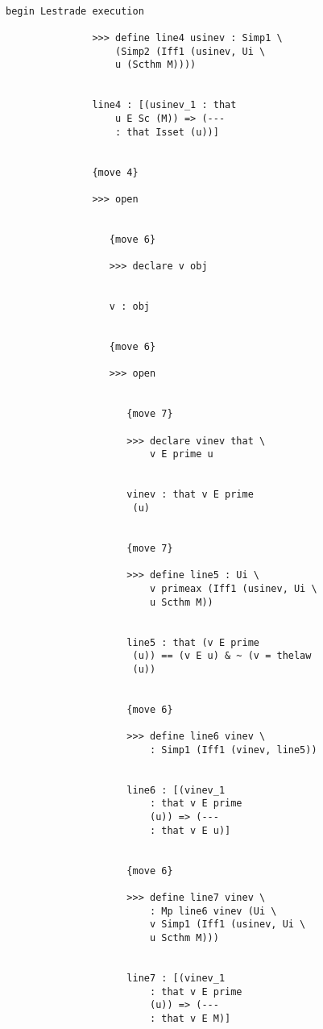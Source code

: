 \documentclass[12pt]{article}
\begin{document}
\begin{verbatim}

begin Lestrade execution

               >>> define line4 usinev : Simp1 \
                   (Simp2 (Iff1 (usinev, Ui \
                   u (Scthm M))))


               line4 : [(usinev_1 : that 
                   u E Sc (M)) => (--- 
                   : that Isset (u))]


               {move 4}

               >>> open


                  {move 6}

                  >>> declare v obj


                  v : obj


                  {move 6}

                  >>> open


                     {move 7}

                     >>> declare vinev that \
                         v E prime u


                     vinev : that v E prime 
                      (u)


                     {move 7}

                     >>> define line5 : Ui \
                         v primeax (Iff1 (usinev, Ui \
                         u Scthm M))


                     line5 : that (v E prime 
                      (u)) == (v E u) & ~ (v = thelaw 
                      (u))


                     {move 6}

                     >>> define line6 vinev \
                         : Simp1 (Iff1 (vinev, line5))


                     line6 : [(vinev_1 
                         : that v E prime 
                         (u)) => (--- 
                         : that v E u)]


                     {move 6}

                     >>> define line7 vinev \
                         : Mp line6 vinev (Ui \
                         v Simp1 (Iff1 (usinev, Ui \
                         u Scthm M)))


                     line7 : [(vinev_1 
                         : that v E prime 
                         (u)) => (--- 
                         : that v E M)]



\end{verbatim}
\end{document}
